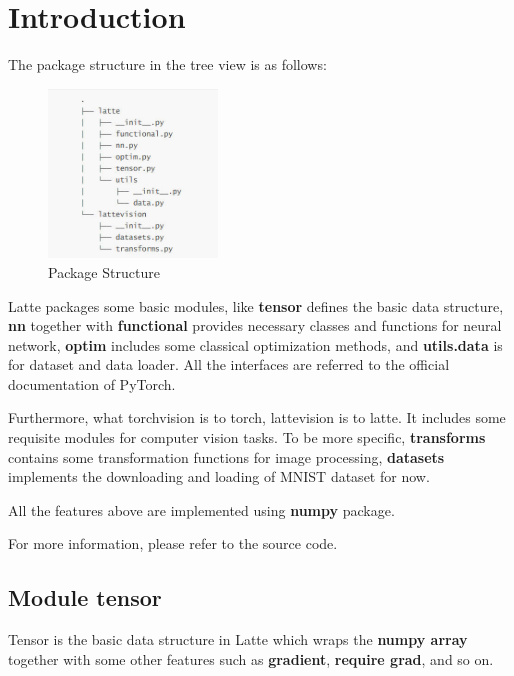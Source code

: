 \documentclass[a4paper, 11pt]{article} %
\begin{document}
\bigskip

\section{\textbf{Introduction}}

The package structure in the tree view is as follows:

\begin{figure}[H]
	\centering
	\includegraphics[width=0.4\textwidth]{./img/tree.jpg}
	\caption{Package Structure}
\end{figure}

Latte packages some basic modules, like \textbf{tensor} defines the basic data structure,
\textbf{nn} together with \textbf{functional} provides necessary classes and functions
for neural network, \textbf{optim} includes some classical optimization methods, and
\textbf{utils.data} is for dataset and data loader. All the interfaces are referred to
the official documentation of PyTorch.

Furthermore, what torchvision is to torch, lattevision is to latte. It includes some
requisite modules for computer vision tasks. To be more specific, \textbf{transforms}
contains some transformation functions for image processing, \textbf{datasets} implements
the downloading and loading of MNIST dataset for now.

All the features above are implemented using \textbf{numpy} package.

For more information, please refer to the source code.

\subsection{\textbf{Module tensor}}

Tensor is the basic data structure in Latte which wraps the \textbf{numpy array} together
with some other features such as \textbf{gradient}, \textbf{require grad}, and so on.
\end{document}
